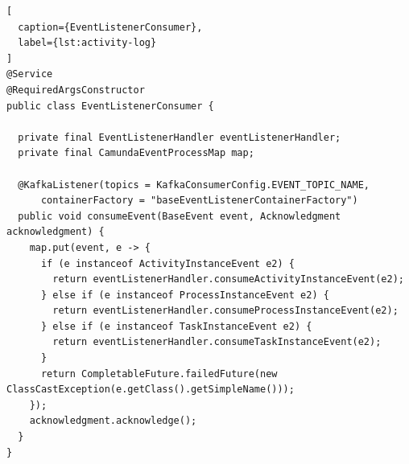 \begin{lstlisting}[
  caption={EventListenerConsumer},
  label={lst:activity-log}
]
@Service
@RequiredArgsConstructor
public class EventListenerConsumer {

  private final EventListenerHandler eventListenerHandler;
  private final CamundaEventProcessMap map;

  @KafkaListener(topics = KafkaConsumerConfig.EVENT_TOPIC_NAME,
      containerFactory = "baseEventListenerContainerFactory")
  public void consumeEvent(BaseEvent event, Acknowledgment acknowledgment) {
    map.put(event, e -> {
      if (e instanceof ActivityInstanceEvent e2) {
        return eventListenerHandler.consumeActivityInstanceEvent(e2);
      } else if (e instanceof ProcessInstanceEvent e2) {
        return eventListenerHandler.consumeProcessInstanceEvent(e2);
      } else if (e instanceof TaskInstanceEvent e2) {
        return eventListenerHandler.consumeTaskInstanceEvent(e2);
      }
      return CompletableFuture.failedFuture(new ClassCastException(e.getClass().getSimpleName()));
    });
    acknowledgment.acknowledge();
  }
}
\end{lstlisting}